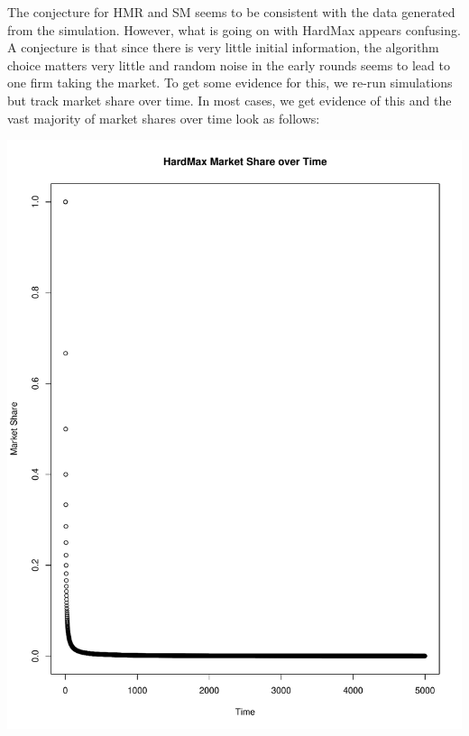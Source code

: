 \documentclass[11pt,letterpaper]{article}
\begin{document}


The conjecture for HMR and SM seems to be consistent with the data generated from the simulation. However, what is going on with HardMax appears confusing. A conjecture is that since there is very little initial information, the algorithm choice matters very little and random noise in the early rounds seems to lead to one firm taking the market. To get some evidence for this, we re-run simulations but track market share over time. In most cases, we get evidence of this and the vast majority of market shares over time look as follows:

\includegraphics[scale=0.25]{decreasing_ms_over_time} \\
\end{document}
